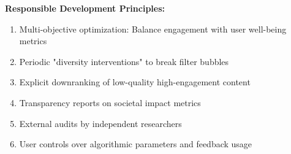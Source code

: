 \textbf{Responsible Development Principles:}
\begin{enumerate}
    \item Multi-objective optimization: Balance engagement with user well-being metrics
    \item Periodic "diversity interventions" to break filter bubbles
    \item Explicit downranking of low-quality high-engagement content
    \item Transparency reports on societal impact metrics
    \item External audits by independent researchers
    \item User controls over algorithmic parameters and feedback usage
\end{enumerate}

\begin{figure*}[ht]
\centering
{}
\end{figure*}
